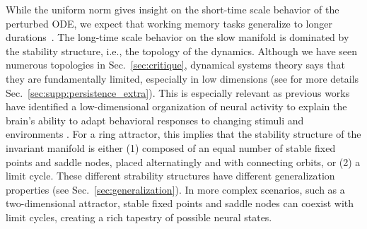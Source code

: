 \documentclass{article} %
\newcommand{\mpcomment}[1]{\textcolor{mpcolor}{(#1)}}
\newcommand{\pscomment}[1]{\textcolor{BurntOrange}{(#1)}}
\newcounter{ct}
\theoremstyle{definition}
\theoremstyle{remark}
\begin{document}
While the uniform norm gives insight on the short-time scale behavior of the perturbed ODE, we expect that working memory tasks generalize to longer durations~\citep{Park2023a}.
The long-time scale behavior on the slow manifold is dominated by the stability structure, i.e., the topology of the dynamics.
Although we have seen numerous topologies in Sec.~\ref{sec:critique}, dynamical systems theory says that they are fundamentally limited, especially in low dimensions (see for more details Sec.~\ref{sec:supp:persistence_extra}).
This is especially relevant as previous works have identified a low-dimensional organization of neural activity to explain the brain's ability to adapt behavioral responses to changing stimuli and environments \citep{beiran2023parametric,altan2023low,fanthomme2021low}.
For a ring attractor, this implies that the stability structure of the invariant manifold is either
(1) composed of an equal number of stable fixed points and saddle nodes, placed alternatingly and with connecting orbits, or (2) a limit cycle.
These different strability structures have different generalization properties (see Sec.~\ref{sec:generalization}).
In more complex scenarios, such as a two-dimensional attractor, stable fixed points and saddle nodes can coexist with limit cycles, creating a rich tapestry of possible neural states.
\end{document}
